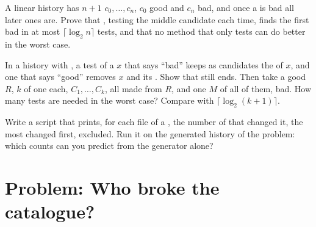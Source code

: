 \begin{exercise}[$\star\star\star$]\label{exo:b1:version-control:10}
A linear history has $n + 1$  $c_0, \dots, c_n$, $c_0$ good and $c_n$ bad, and once a  is bad all later ones
are. Prove that , testing the middle candidate each time, finds the first bad  in at most $\lceil \log_2
n \rceil$ tests, and that no method that only tests  can do better in the worst case.
\end{exercise}

\begin{exercise}[$\star\star\star$]\label{exo:b1:version-control:11}
In a history with , a test of a  $x$ that says ``bad'' keeps as candidates the  of $x$, and one that
says ``good'' removes $x$ and its . Show that  still ends. Then take a good  $R$, $k$ 
of one  each, $C_1, \dots, C_k$, all made from $R$, and one  $M$ of all of them, bad. How many tests are needed
in the worst case? Compare with $\lceil \log_2 (k + 1) \rceil$.
\end{exercise}

\begin{exercise}[$\star\star\star$]\label{exo:b1:version-control:12}
Write a script  that prints, for each file of a , the number of  that
changed it, the most changed first,   excluded. Run it on the generated history of the problem: which
counts can you predict from the generator alone?
\end{exercise}

\section{Problem: Who broke the catalogue?}\label{sec:b1:version-control:problem}


